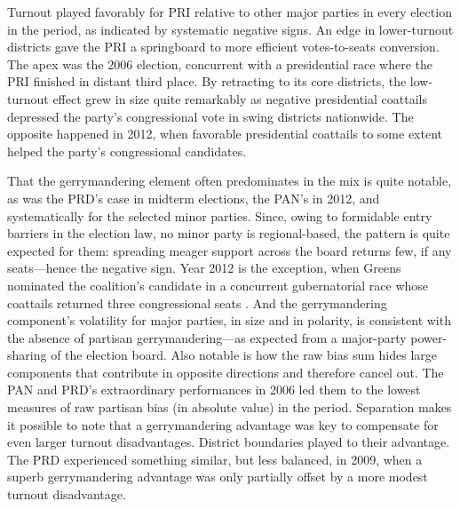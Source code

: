 \documentclass[letter,12pt]{article}
\begin{document}
Turnout played favorably for PRI relative to other major parties in every election in the period, as indicated by systematic negative signs. An edge in lower-turnout districts gave the PRI a springboard to more efficient votes-to-seats conversion. The apex was the 2006 election, concurrent with a presidential race where the PRI finished in distant third place. By retracting to its core districts, the low-turnout effect grew in size quite remarkably as negative presidential coattails depressed the party's congressional vote in swing districts nationwide. The opposite happened in 2012, when favorable presidential coattails to some extent helped the party's congressional candidates.

That the gerrymandering element often predominates in the mix is quite notable, as was the PRD's case in midterm elections, the PAN's in 2012, and systematically for the selected minor parties. Since, owing to formidable entry barriers in the election law, no minor party is regional-based, the pattern is quite expected for them: spreading meager support across the board returns few, if any seats---hence the negative sign. Year 2012 is the exception, when Greens nominated the coalition's candidate in a concurrent gubernatorial race whose coattails returned three congressional seats \citep{magar.gubCoatMx.2012}. And the gerrymandering component's volatility for major parties, in size and in polarity, is consistent with the absence of partisan gerrymandering---as expected from a major-party power-sharing of the election board. Also notable is how the raw bias sum hides large components that contribute in opposite directions and therefore cancel out. The PAN and PRD's extraordinary performances in 2006 led them to the lowest measures of raw partisan bias (in absolute value) in the period. Separation makes it possible to note that a gerrymandering advantage was key to compensate for even larger turnout disadvantages. District boundaries played to their advantage. The PRD experienced something similar, but less balanced, in 2009, when a superb gerrymandering advantage was only partially offset by a more modest turnout disadvantage. 
\end{document}
